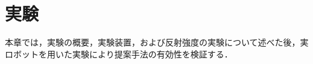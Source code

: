 \chapter{実験}

  本章では，実験の概要，実験装置，および反射強度の実験について述べた後，実ロボットを用いた実験により提案手法の有効性を検証する．

\label{chap:experiments}
%




%
